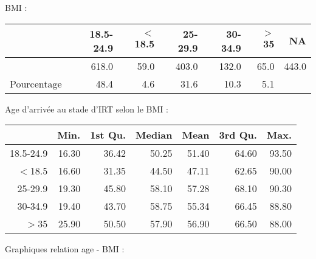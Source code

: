 \documentclass[11pt,a4paper]{article}\usepackage[]{graphicx}\usepackage[]{color}
\begin{document}
BMI :

\begin{table}[H]
\centering
\begin{tabular}{rrrrrrr}
  \hline
 & 18.5-24.9 & $<$18.5 & 25-29.9 & 30-34.9 & $>$35 & NA \\ 
  \hline
 & 618.0 & 59.0 & 403.0 & 132.0 & 65.0 & 443.0 \\ 
  Pourcentage & 48.4 & 4.6 & 31.6 & 10.3 & 5.1 &  \\ 
   \hline
\end{tabular}
\end{table}


Age d'arrivée au stade d'IRT selon le BMI :

\begin{table}[H]
\centering
\begin{tabular}{rrrrrrr}
  \hline
 & Min. & 1st Qu. & Median & Mean & 3rd Qu. & Max. \\ 
  \hline
18.5-24.9 & 16.30 & 36.42 & 50.25 & 51.40 & 64.60 & 93.50 \\ 
  $<$18.5 & 16.60 & 31.35 & 44.50 & 47.11 & 62.65 & 90.00 \\ 
  25-29.9 & 19.30 & 45.80 & 58.10 & 57.28 & 68.10 & 90.30 \\ 
  30-34.9 & 19.40 & 43.70 & 58.75 & 55.34 & 66.45 & 88.80 \\ 
  $>$35 & 25.90 & 50.50 & 57.90 & 56.90 & 66.50 & 88.00 \\ 
   \hline
\end{tabular}
\end{table}


Graphiques relation age - BMI :
\end{document}
